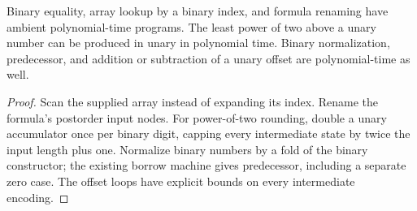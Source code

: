 \begin{lemma}
\label{lem:pcp-padding-programs}
\leanok
Binary equality, array lookup by a binary index, and formula renaming have
ambient polynomial-time programs. The least power of two above a unary number
can be produced in unary in polynomial time. Binary normalization, predecessor,
and addition or subtraction of a unary offset are polynomial-time as well.
\end{lemma}
\begin{proof}
\leanok
Scan the supplied array instead of expanding its index. Rename the formula's
postorder input nodes. For power-of-two rounding, double a unary accumulator
once per binary digit, capping every intermediate state by twice the input
length plus one. Normalize binary numbers by a fold of the binary constructor;
the existing borrow machine gives predecessor, including a separate zero case.
The offset loops have explicit bounds on every intermediate encoding.
\end{proof}

